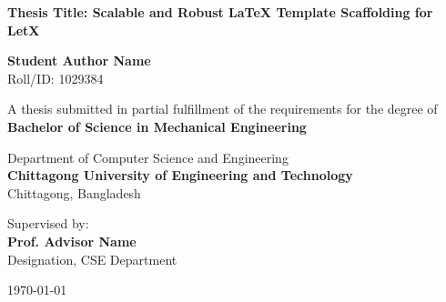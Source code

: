 \begin{titlepage}
\begin{center}
    \vspace*{1cm}
    
    
    \vspace{1.5cm}
    
    {\huge \bfseries \color{primary} Thesis Title: Scalable and Robust LaTeX Template Scaffolding for LetX}
    
    \vspace{1.5cm}
    
    {\Large \bfseries Student Author Name} \\
    \vspace{0.2cm}
    {Roll/ID: 1029384}
    
    \vspace{1.5cm}
    
    {A thesis submitted in partial fulfillment of the requirements for the degree of} \\
    \vspace{0.3cm}
    {\large \bfseries \color{secondary} Bachelor of Science in Mechanical Engineering}
    
    \vspace{1.5cm}
    
    {Department of Computer Science and Engineering} \\
    \vspace{0.2cm}
    {\large \bfseries \color{primary} Chittagong University of Engineering and Technology} \\
    \vspace{0.1cm}
    {Chittagong, Bangladesh}
    
    \vfill
    
    {Supervised by:} \\
    {\large \bfseries Prof. Advisor Name} \\
    {Designation, CSE Department}
    
    \vspace{1cm}
    
    {\large \today}
    
\end{center}
\end{titlepage}
